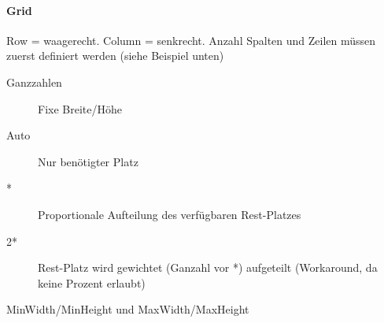 \paragraph{Grid} 
Row = waagerecht. Column = senkrecht. 
Anzahl Spalten und Zeilen müssen zuerst definiert werden (siehe Beispiel unten) 
\begin{description}
    \item[Ganzzahlen] Fixe Breite/Höhe
    \item[Auto] Nur benötigter Platz 
    \item[*] Proportionale Aufteilung des verfügbaren Rest-Platzes 
    \item[2*] Rest-Platz wird gewichtet (Ganzahl vor *) aufgeteilt (Workaround, da keine Prozent erlaubt)
    \item[MinWidth/MinHeight und MaxWidth/MaxHeight]
\end{description}

